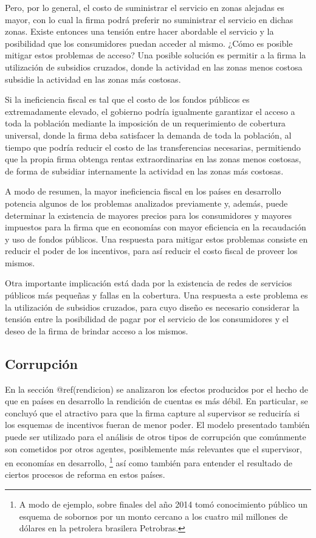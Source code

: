 \documentclass[
  12pt,
  spanish,
]{book}
\begin{document}
Pero, por lo general, el costo de suministrar el servicio en zonas
alejadas es mayor, con lo cual la firma podrá preferir no suministrar el
servicio en dichas zonas. Existe entonces una tensión entre hacer
abordable el servicio y la posibilidad que los consumidores puedan
acceder al mismo. ¿Cómo es posible mitigar estos problemas de acceso?
Una posible solución es permitir a la firma la utilización de subsidios
cruzados, donde la actividad en las zonas menos costosa subsidie la
actividad en las zonas más costosas.

Si la ineficiencia fiscal es tal que el costo de los fondos públicos es
extremadamente elevado, el gobierno podría igualmente garantizar el
acceso a toda la población mediante la imposición de un requerimiento de
cobertura universal, donde la firma deba satisfacer la demanda de toda
la población, al tiempo que podría reducir el costo de las
transferencias necesarias, permitiendo que la propia firma obtenga
rentas extraordinarias en las zonas menos costosas, de forma de
subsidiar internamente la actividad en las zonas más costosas.

A modo de resumen, la mayor ineficiencia fiscal en los países en
desarrollo potencia algunos de los problemas analizados previamente y,
además, puede determinar la existencia de mayores precios para los
consumidores y mayores impuestos para la firma que en economías con
mayor eficiencia en la recaudación y uso de fondos públicos. Una
respuesta para mitigar estos problemas consiste en reducir el poder de
los incentivos, para así reducir el costo fiscal de proveer los mismos.

Otra importante implicación está dada por la existencia de redes de
servicios públicos más pequeñas y fallas en la cobertura. Una respuesta
a este problema es la utilización de subsidios cruzados, para cuyo
diseño es necesario considerar la tensión entre la posibilidad de pagar
por el servicio de los consumidores y el deseo de la firma de brindar
acceso a los mismos.

\hypertarget{corrupciuxf3n}{%
\subsection{Corrupción}\label{corrupciuxf3n}}

En la sección @ref(rendicion) se analizaron los efectos producidos por
el hecho de que en países en desarrollo la rendición de cuentas es más
débil. En particular, se concluyó que el atractivo para que la firma
capture al supervisor se reduciría si los esquemas de incentivos fueran
de menor poder. El modelo presentado también puede ser utilizado para el
análisis de otros tipos de corrupción que comúnmente son cometidos por
otros agentes, posiblemente más relevantes que el supervisor, en
economías en desarrollo, \footnote{A modo de ejemplo, sobre finales del
  año 2014 tomó conocimiento público un esquema de sobornos por un monto
  cercano a los cuatro mil millones de dólares en la petrolera brasilera
  Petrobras.} así como también para entender el resultado de ciertos
procesos de reforma en estos países.
\end{document}
